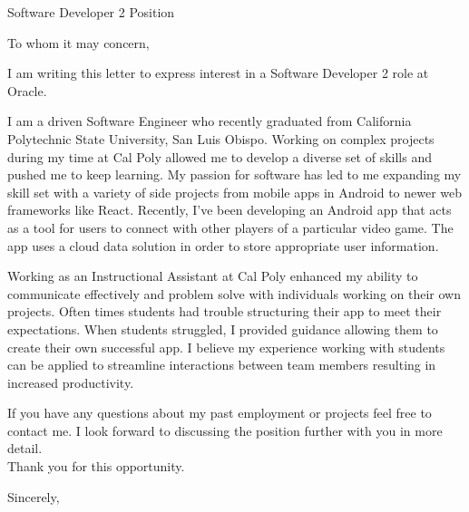 \documentclass[]{letter}
\makeatletter
\newcommand{\role}{Software Developer 2 }
\newcommand{\company}{Oracle}
\newcommand{\roleAt}{\role role at \company}
\newcommand{\university}{California Polytechnic State University, San Luis Obispo}
\newcommand{\email}{griffinpjohnson@gmail.com}
\newcommand{\phoneNum}{(425) 417 - 5098 }
\newcommand{\myname}{Griffin Johnson}
\makeatother
\begin{document}

\begin{letter}
{
	\role Position
}

\address
{
	\myname \\
	1200 Oceanaire Dr Apt B \\
	San Luis Obispo, CA 93405 \\
	\email \\
	\phoneNum
}

\opening{To whom it may concern,}

I am writing this letter to express interest in a \roleAt.

I am a driven Software Engineer who recently graduated from \university. Working on complex projects during my time at Cal Poly allowed me to develop a diverse set of skills and pushed me to keep learning. My passion for software has led to me expanding my skill set with a variety of side projects from mobile apps in Android to newer web frameworks like React. Recently, I've been developing an Android app that acts as a tool for users to connect with other players of a particular video game. The app uses a cloud data solution in order to store appropriate user information.


Working as an Instructional Assistant at Cal Poly enhanced my ability to communicate effectively and problem solve with individuals working on their own projects. Often times students had trouble structuring their app to meet their expectations. When students struggled, I provided guidance allowing them to create their own successful app. I believe my experience working with students can be applied to streamline interactions between team members resulting in increased productivity. 

If you have any questions about my past employment or projects feel free to contact me. I look forward to discussing the position further with you in more detail.  \\

Thank you for this opportunity.

\signature
{ 
	\myname
}


\closing
{
	Sincerely,
}


\end{letter}
\end{document}
